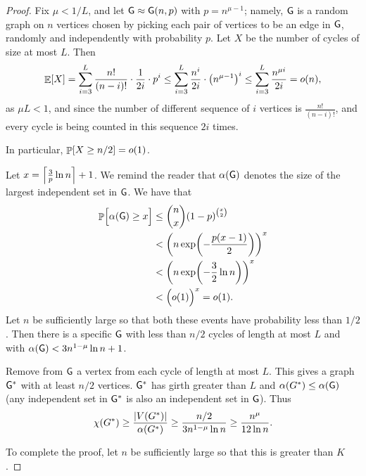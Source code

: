 \begin{proof}
    Fix $\mu < 1/L$, and let $\mathsf{G} \approx \mathsf{G}(n,p)$ with
    $p=n^{\mu-1}$; namely, $\mathsf{G}$ is a random graph on $n$ vertices
    chosen by picking each pair of vertices to be an edge in $\mathsf{G}$,
    randomly and independently with probability $p$. Let $X$ be the
    number of cycles of size at most $L$. Then
    \begin{align*}
    \Ex{X} = \sum_{i=3}^{L}  \frac{n!}{(n-i)!} \cdot
    \frac{1}{2i} \cdot p^{i} \leq \sum_{i=3}^L
    \frac{n^i}{2i} \cdot \pth{n^{\mu -1}}^{i} 
    \leq \sum_{i=3}^{L} \frac{n^{\mu i}}{2i} = o(n),
    \end{align*}
    as $\mu L < 1$, and since the number of different
    sequence of $i$ vertices is $\frac{n!}{(n-i)!}$, and
    every cycle is being counted in this sequence $2i$
    times. 

    In particular, 
    $\Prob{X \geq n/2} = o(1)$.
    
    Let $x = \left\lceil {\tfrac{3}{p} \ln n} \right\rceil + 1$. We remind the reader that
    $\alpha(\mathsf{G})$ denotes the size of the largest independent set in
    $\mathsf{G}$. We have that
    \begin{align*}
        \Prob{\Bigl.\alpha(\Graph) \geq x }%
        &\leq%
        \binom{n}{x} \pth{1-p}^{\binom{x}{2}}%
        \\&<%
        \pth[]{ n \exp \pth{ -\frac{p (x-1)}{2}}}^x%
        \\&<%
        \pth[]{ n \exp \pth{ -\frac{3}{2} \ln n}}^x%
        \\&<%
        \pth[]{ \Bigl.o(1) }^x = o(1).
    \end{align*}
    Let $n$ be sufficiently large so that both these events have
    probability less than $1/2$. Then there is a specific $\mathsf{G}$ with
    less than $n/2$ cycles of length at most $L$ and with $\alpha(\mathsf{G}) <
    3 n^{1- \mu} \ln n + 1$.
    
    Remove from $\mathsf{G}$ a vertex from each cycle of length at most
    $L$. This gives a graph $\mathsf{G}^*$ with at least $n/2$
    vertices. $\mathsf{G}^*$ has girth greater than $L$ and $\alpha(G^*)
    \leq \alpha(\mathsf{G})$ (any independent set in $\mathsf{G}^*$ is also an
    independent set in $\mathsf{G}$). Thus
    \begin{align*}
        \chi(G^*)%
        \geq%
        \frac{\cardin{V(G^*)}}{\alpha(G^*)}%
        \geq%
        \frac{n/2}{3n^{1-\mu} \ln n }%
        \geq%
        \frac{n^{\mu}}{12 \ln n}.
    \end{align*}

    To complete the proof, let $n$ be sufficiently large so
    that this is greater than $K$. 
\end{proof}

